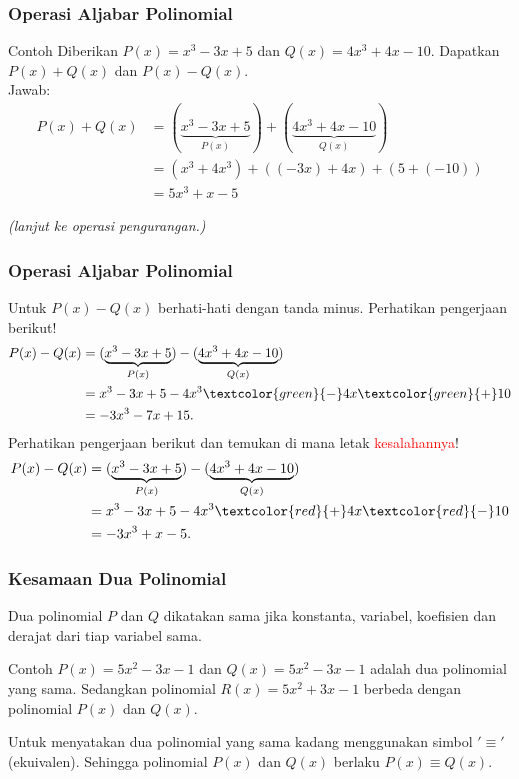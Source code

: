 \documentclass[11pt]{beamer}
\begin{document}
	\begin{frame}
		\frametitle{Operasi Aljabar Polinomial}
		\begin{exampleblock}{Contoh}
			Diberikan $P(x)=x^3-3x+5$ dan $Q(x)=4x^3+4x-10$. Dapatkan $P(x)+Q(x)$ dan $P(x)-Q(x)$. \\Jawab:
			\begin{align*}
				P(x)+Q(x)&=(\underbrace{x^3-3x+5}_{P(x)})+(\underbrace{4x^3+4x-10}_{Q(x)})\\
				&=(x^3+4x^3)+\left((-3x)+4x\right)+\left(5+(-10)\right)\\
				&=5x^3+x-5		
			\end{align*}
		\end{exampleblock}
		\textit{(lanjut ke operasi pengurangan.)}
		
	\end{frame}
	
	\begin{frame}
		\frametitle{Operasi Aljabar Polinomial}
		
		Untuk $P(x)-Q(x)$ berhati-hati dengan tanda minus. Perhatikan pengerjaan berikut!
		\begin{align}
			P(x)-Q(x)&=(\underbrace{x^3-3x+5}_{P(x)})-(\underbrace{4x^3+4x-10}_{Q(x)})\\
			&=x^3-3x+5-4x^3 \textcolor{green}{-}4x \textcolor{green}{+}10\\
			&=-3x^3-7x+15.
		\end{align}
		Perhatikan pengerjaan berikut dan temukan di mana letak \textcolor{red}{kesalahannya}!
		\begin{align}
			P(x)-Q(x)&=(\underbrace{x^3-3x+5}_{P(x)})-(\underbrace{4x^3+4x-10}_{Q(x)})\\
			&=x^3-3x+5-4x^3  \textcolor{red}{+}4x \textcolor{red}{-}10\\
			&=-3x^3+x-5.
		\end{align}
		
	\end{frame}
	
	\begin{frame}
		\frametitle{Kesamaan Dua Polinomial}
		Dua polinomial $P$ dan $Q$ dikatakan sama jika konstanta, variabel, koefisien dan derajat dari tiap variabel sama.
		\begin{exampleblock}{Contoh}
			$P(x)=5x^2-3x-1$ dan $Q(x)=5x^2-3x-1$ adalah dua polinomial yang sama. Sedangkan polinomial $R(x)=5x^2+3x-1$ berbeda dengan polinomial $P(x)$ dan $Q(x)$.
		\end{exampleblock}
		Untuk menyatakan dua polinomial yang sama kadang menggunakan simbol $'\equiv'$ (ekuivalen). Sehingga polinomial $P(x)$ dan $Q(x)$ berlaku $P(x)\equiv Q(x)$.
	\end{frame}
	
\end{document}
